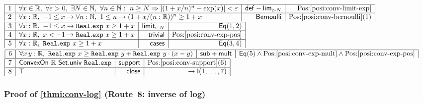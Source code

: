 \documentclass[11pt,reqno]{amsart}
\providecommand{\R}{\mathbb{R}}
\providecommand{\N}{\mathbb{N}}
\theoremstyle{redplain}
\numberwithin{equation}{section}
\begin{document}
\begin{center}
$%
\begin{array}{|c|l|r|r|}
\hline
1 & \forall x\in \R,\ \forall \varepsilon >0,\ \exists N\in \N,\ \forall
n\in \N:\ n\geq N\Rightarrow |(1+x/n)^{n}-\exp (x)|<\varepsilon & \mathsf{%
def-lim}_{\varepsilon \text{-}N} & \mbox{Pos:\ref{posi:conv-limit-exp}} \\ 
\hline
2 & \forall x:\mathbb{R},\ -1\leq x\rightarrow \forall n:\mathbb{N},\ 1\leq
n\rightarrow (1+x/(n:\mathbb{R}))^{n}\geq 1+x & \mathsf{Bernoulli} & %
\mbox{Pos:\ref{posi:conv-bernoulli}(1)}%
\end{array}%
$ \noindent $%
\begin{array}{|c|l|r|r|}
\hline
3 & \forall x:\mathbb{R},\ -1\leq x\rightarrow \mathtt{Real.exp}\ x\geq 1+x
& \mathsf{limit}_{\varepsilon \text{-}N} & \mathsf{Eq}(1,2) \\ \hline
4 & \forall x:\mathbb{R},\ x<-1\rightarrow \mathtt{Real.exp}\ x\geq 1+x & 
\mathsf{trivial} & \mbox{Pos:\ref{posi:conv-exp-pos}} \\ \hline
5 & \forall x:\mathbb{R},\ \mathtt{Real.exp}\ x\geq 1+x & \mathsf{cases} & 
\mathsf{Eq}(3,4)%
\end{array}%
$ \noindent $%
\begin{array}{|c|l|r|r|}
\hline
6 & \forall x\,y:\mathbb{R},\ \mathtt{Real.exp}\ x\geq \mathtt{Real.exp}\ y+%
\mathtt{Real.exp}\ y\cdot (x-y) & \mathsf{sub+mult} & \mathsf{Eq}(5)\wedge %
\mbox{Pos:\ref{posi:conv-exp-mult}}\wedge \mbox{Pos:\ref{posi:conv-exp-pos}}%
\end{array}%
$ \noindent $%
\begin{array}{|c|l|r|r|}
\hline
7 & \mathsf{ConvexOn}\ \mathbb{R}\ \mathsf{Set.univ}\ \mathtt{Real.exp} & 
\mathsf{support} & \mbox{Pos:\ref{posi:conv-support}(6)} \\ \hline
8 & \top & \mathsf{close} & \rightarrow \mathsf{I}(1,\dots ,7) \\ \hline
\end{array}%
$
\end{center}

\subsubsection*{Proof of \autoref{thmi:conv-log} (Route~8: inverse of log)}
\end{document}
